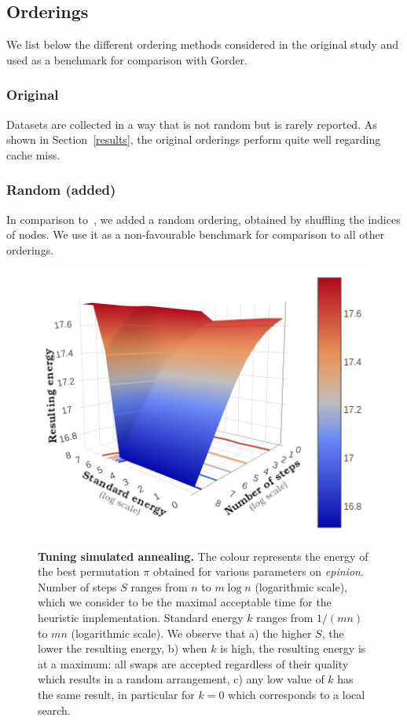 
\subsection{Orderings} \label{orders}

We list below the different ordering methods considered in the original study and used as a benchmark for comparison with Gorder.

\subsubsection{Original}
Datasets are collected in a way that is not random but is rarely reported.
%
As shown in Section~\ref{results}, the original orderings perform quite well regarding cache miss.

\subsubsection{Random (added)}
In comparison to~\cite{gorder}, we added a random ordering, obtained by shuffling the indices of nodes.
%
We use it as a non-favourable benchmark for comparison to all other orderings. 

\begin{figure}[]
    \centering
    \includegraphics[width=.6\linewidth]{img/tune_sa.png}
    \caption{\textbf{Tuning simulated annealing.} The colour represents the energy of the best permutation $\pi$ obtained for various parameters on \textit{epinion}. Number of steps $S$ ranges from  $n$ to $m\log n$ (logarithmic scale), which we consider to be the maximal acceptable time for the heuristic implementation. Standard energy $k$ ranges from $1/(mn)$ to $mn$ (logarithmic scale). We observe that a) the higher $S$, the lower the resulting energy, b) when $k$ is high, the resulting energy is at a maximum: all swaps are accepted regardless of their quality which results in a random arrangement, c) any low value of $k$ has the same result, in particular for $k=0$ which corresponds to a local search.}\label{img-tune-sa}
\end{figure}


